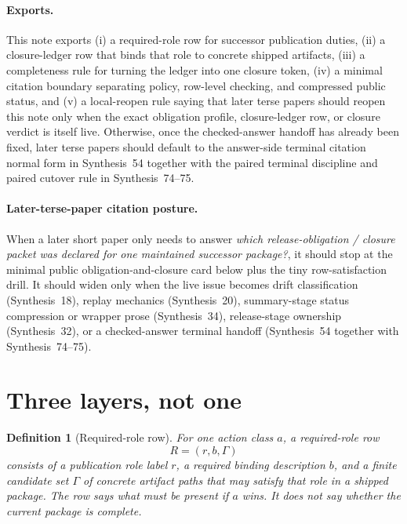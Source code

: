 \documentclass[11pt]{article}
\newtheorem{definition}{Definition}
\begin{document}
\paragraph{Exports.}
This note exports (i) a required-role row for successor publication duties, (ii) a closure-ledger row that binds that role to concrete shipped artifacts, (iii) a completeness rule for turning the ledger into one closure token, (iv) a minimal citation boundary separating policy, row-level checking, and compressed public status, and (v) a local-reopen rule saying that later terse papers should reopen this note only when the exact obligation profile, closure-ledger row, or closure verdict is itself live. Otherwise, once the checked-answer handoff has already been fixed, later terse papers should default to the answer-side terminal citation normal form in Synthesis~54 together with the paired terminal discipline and paired cutover rule in Synthesis~74--75.\cite{series:challengeanswerreviewmenus,series:pairedterminalcitationdiscipline,series:pairedterminalcutoverrules}

\paragraph{Later-terse-paper citation posture.}
When a later short paper only needs to answer \emph{which release-obligation / closure packet was declared for one maintained successor package?}, it should stop at the minimal public obligation-and-closure card below plus the tiny row-satisfaction drill. It should widen only when the live issue becomes drift classification (Synthesis~18), replay mechanics (Synthesis~20), summary-stage status compression or wrapper prose (Synthesis~34), release-stage ownership (Synthesis~32), or a checked-answer terminal handoff (Synthesis~54 together with Synthesis~74--75).\cite{series:planstateequiv,series:auditorreplay,series:statusenvelopes,series:releasespine,series:challengeanswerreviewmenus,series:pairedterminalcitationdiscipline,series:pairedterminalcutoverrules}

\section{Three layers, not one}

\begin{definition}[Required-role row]
For one action class $a$, a \emph{required-role row}
\[
R=(r,b,\Gamma)
\]
consists of a publication role label $r$, a required binding description $b$, and a finite candidate set $\Gamma$ of concrete artifact paths that may satisfy that role in a shipped package.
The row says what must be present if $a$ wins.
It does not say whether the current package is complete.
\end{definition}
\end{document}
